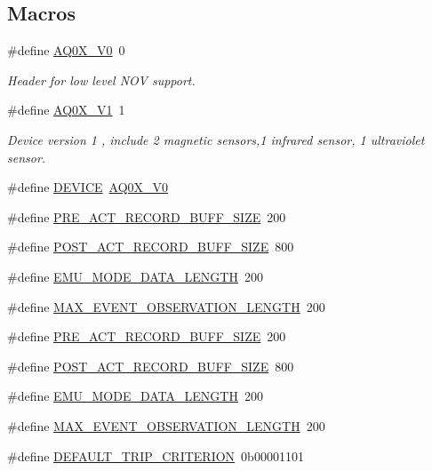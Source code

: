 \subsection*{Macros}
\begin{DoxyCompactItemize}
\item 
\#define \hyperlink{a00003_ad750d25410f340cb93a424349ccecdd3}{A\+Q0\+X\+\_\+\+V0}~0
\begin{DoxyCompactList}\small\item\em Header for low level N\+O\+V support. \end{DoxyCompactList}\item 
\#define \hyperlink{a00003_a4fe07f06b0aa99b609cb9f3d37b30932}{A\+Q0\+X\+\_\+\+V1}~1
\begin{DoxyCompactList}\small\item\em Device version 1 , include 2 magnetic sensors,1 infrared sensor, 1 ultraviolet sensor. \end{DoxyCompactList}\item 
\#define \hyperlink{a00003_a775d096fbc3988fb7ed858b79ef44e22}{D\+E\+V\+I\+C\+E}~\hyperlink{a00003_ad750d25410f340cb93a424349ccecdd3}{A\+Q0\+X\+\_\+\+V0}
\item 
\#define \hyperlink{a00003_a18dcecc16ded13fa622e0913e73442e6}{P\+R\+E\+\_\+\+A\+C\+T\+\_\+\+R\+E\+C\+O\+R\+D\+\_\+\+B\+U\+F\+F\+\_\+\+S\+I\+Z\+E}~200
\item 
\#define \hyperlink{a00003_ab1ad440de86fff80e517ad748de2ee39}{P\+O\+S\+T\+\_\+\+A\+C\+T\+\_\+\+R\+E\+C\+O\+R\+D\+\_\+\+B\+U\+F\+F\+\_\+\+S\+I\+Z\+E}~800
\item 
\#define \hyperlink{a00003_af4c3a8ad94feb4d7bda7f107f34baf41}{E\+M\+U\+\_\+\+M\+O\+D\+E\+\_\+\+D\+A\+T\+A\+\_\+\+L\+E\+N\+G\+T\+H}~200
\item 
\#define \hyperlink{a00003_aa060aeb1ecb530b3c6f6d91060999b70}{M\+A\+X\+\_\+\+E\+V\+E\+N\+T\+\_\+\+O\+B\+S\+E\+R\+V\+A\+T\+I\+O\+N\+\_\+\+L\+E\+N\+G\+T\+H}~200
\item 
\#define \hyperlink{a00003_a18dcecc16ded13fa622e0913e73442e6}{P\+R\+E\+\_\+\+A\+C\+T\+\_\+\+R\+E\+C\+O\+R\+D\+\_\+\+B\+U\+F\+F\+\_\+\+S\+I\+Z\+E}~200
\item 
\#define \hyperlink{a00003_ab1ad440de86fff80e517ad748de2ee39}{P\+O\+S\+T\+\_\+\+A\+C\+T\+\_\+\+R\+E\+C\+O\+R\+D\+\_\+\+B\+U\+F\+F\+\_\+\+S\+I\+Z\+E}~800
\item 
\#define \hyperlink{a00003_af4c3a8ad94feb4d7bda7f107f34baf41}{E\+M\+U\+\_\+\+M\+O\+D\+E\+\_\+\+D\+A\+T\+A\+\_\+\+L\+E\+N\+G\+T\+H}~200
\item 
\#define \hyperlink{a00003_aa060aeb1ecb530b3c6f6d91060999b70}{M\+A\+X\+\_\+\+E\+V\+E\+N\+T\+\_\+\+O\+B\+S\+E\+R\+V\+A\+T\+I\+O\+N\+\_\+\+L\+E\+N\+G\+T\+H}~200
\item 
\#define \hyperlink{a00003_a0ff9495f8521ea7698e83e7b4d6a6985}{D\+E\+F\+A\+U\+L\+T\+\_\+\+T\+R\+I\+P\+\_\+\+C\+R\+I\+T\+E\+R\+I\+O\+N}~0b00001101
\end{DoxyCompactItemize}

